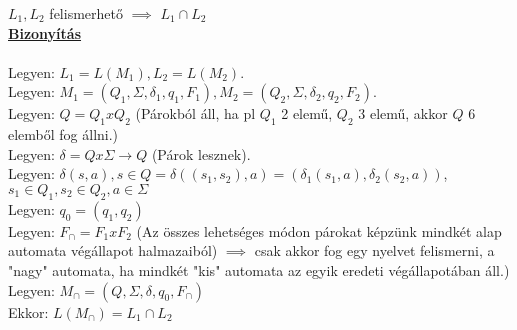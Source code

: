 \begin{frame}
\begin{tcolorbox}[title={Tétel: Felismerhető nyelvek metszete}]
$L_1, L_2$ felismerhető $\implies$ $L_1 \cap L_2$\\
\tcblower
\msmallskip
\underline{\textbf{Bizonyítás}}\\
\mmedskip
\\
Legyen: $L_1 = L(M_1), L_2 = L(M_2)$.\\
Legyen: $M_1 = (Q_1, \Sigma , {\delta}_1, q_1, F_1), M_2 = (Q_2, \Sigma , {\delta}_2, q_2, F_2)$.\\
Legyen: $Q = Q_1 x Q_2$ (Párokból áll, ha pl $Q_1$ 2 elemű, $Q_2$ 3 elemű, akkor $Q$ 6 elemből fog állni.)\\
Legyen: $\delta = Q x \Sigma \rightarrow Q$ (Párok lesznek).\\
Legyen: $\delta(s, a), s \in Q = \delta((s_1, s_2), a) = ({\delta}_1(s_1, a), {\delta}_2(s_2, a))$, $s_1 \in Q_1, s_2 \in Q_2, a \in \Sigma$\\
\mbigskip
Legyen: $q_0 = (q_1, q_2)$\\
Legyen: \underline{\textbf{$F_{\cap} = F_1 x F_2$}} (Az összes lehetséges módon párokat képzünk mindkét alap automata végállapot halmazaiból) $\implies$ csak akkor fog egy nyelvet felismerni, a "nagy" automata, ha mindkét "kis" automata az egyik eredeti végállapotában áll.)\\
\msmallskip
Legyen: $M_{\cap} = (Q, \Sigma , \delta , q_0, F_{\cap})$\\
\mbigskip
Ekkor: \underline{$L(M_{\cap}) = L_1 \cap L_2$}\\
\end{tcolorbox}

\end{frame}

